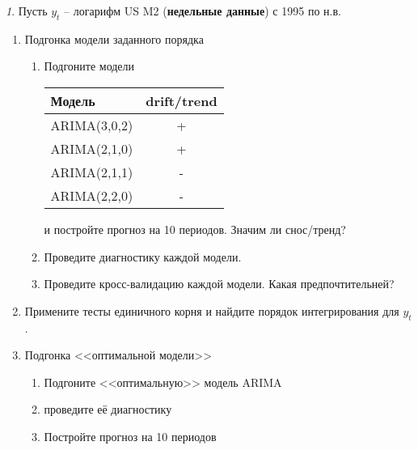 \documentclass[12pt]{article}
\theoremstyle{remark}
\newtheorem{exercise}{}[subsection]
\begin{document}
\begin{exercise}
Пусть \(y_t\) -- логарифм US M2 (\textbf{недельные данные}) с 1995 по н.в.
\begin{enumerate}
	\item Подгонка модели заданного порядка
	\begin{enumerate}
		\item Подгоните модели
		\begin{center}
		\begin{tabular}{l|c}
			Модель & drift/trend \\ \hline
			ARIMA(3,0,2) & + \\
			ARIMA(2,1,0) & + \\
			ARIMA(2,1,1) & - \\
			ARIMA(2,2,0) & - \\ \hline
		\end{tabular}
		\end{center} 
		и постройте прогноз на 10 периодов. Значим ли снос/тренд?
		\item Проведите диагностику каждой модели.
		\item Проведите кросс-валидацию каждой модели. Какая предпочтительней?
	\end{enumerate}
	\item Примените тесты единичного корня и найдите порядок интегрирования для \(y_t\). 
	\item Подгонка <<оптимальной модели>>
	\begin{enumerate}
		\item Подгоните <<оптимальную>> модель ARIMA
		\item проведите её диагностику
		\item Постройте прогноз на 10 периодов
	\end{enumerate}
\end{enumerate}
\end{exercise}
\end{document}
